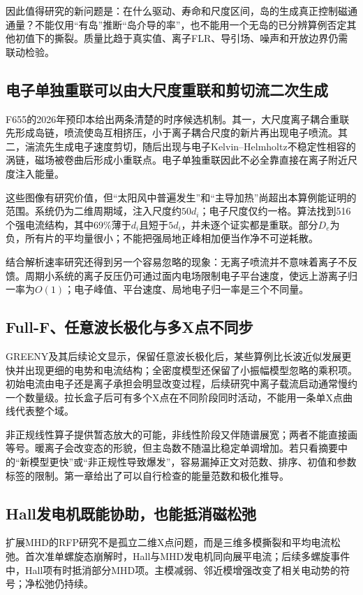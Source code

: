 因此值得研究的新问题是：在什么驱动、寿命和尺度区间，岛的生成真正控制磁通通量？不能仅用“有岛”推断“岛介导的率”，也不能用一个无岛的已分辨算例否定其他初值下的撕裂。质量比趋于真实值、离子FLR、导引场、噪声和开放边界仍需联动检验。

\subsection{电子单独重联可以由大尺度重联和剪切流二次生成}
F655的2026年预印本\citep{F655}给出两条清楚的时序候选机制。其一，大尺度离子耦合重联先形成岛链，喷流使岛互相挤压，小于离子耦合尺度的新片再出现电子喷流。其二，湍流先生成电子速度剪切，随后出现与电子Kelvin--Helmholtz不稳定性相容的涡链，磁场被卷曲后形成小重联点。电子单独重联因此不必全靠直接在离子附近尺度注入能量。

这些图像有研究价值，但“太阳风中普遍发生”和“主导加热”尚超出本算例能证明的范围。系统仍为二维周期域，注入尺度约$50d_i$；电子尺度仅约一格。算法找到516个强电流结构，其中69\%薄于$d_i$且短于$5d_i$，并未逐个证实都是重联。部分$D_e$为负，所有片的平均量很小；不能把强局地正峰相加便当作净不可逆耗散。

结合解析速率研究\citep{F741}还得到另一个容易忽略的现象：无离子喷流并不意味着离子不反馈。周期小系统的离子反压仍可通过面内电场限制电子平台速度，使远上游离子归一率为$O(1)$；电子峰值、平台速度、局地电子归一率是三个不同量。

\subsection{Full-F、任意波长极化与多X点不同步}
GREENY及其后续论文\citep{E473,L314}显示，保留任意波长极化后，某些算例比长波近似发展更快并出现更细的电势和电流结构；全密度模型还保留了小振幅模型忽略的乘积项。初始电流由电子还是离子承担会明显改变过程，后续研究中离子载流启动通常慢约一个数量级。拉长盒子后可有多个X点在不同阶段同时活动，不能用一条单X点曲线代表整个域。

非正规线性算子提供暂态放大的可能，非线性阶段又伴随谱展宽；两者不能直接画等号。暖离子会改变态的形貌，但主岛数不随温比稳定单调增加。若只看摘要中的“新模型更快”或“非正规性导致爆发”，容易漏掉正文对范数、排序、初值和参数标签的限制。第一章给出了可以自行检查的能量范数和极化推导。

\subsection{Hall发电机既能协助，也能抵消磁松弛}
扩展MHD的RFP研究\citep{F798}不是孤立二维X点问题，而是三维多模撕裂和平均电流松弛。首次准单螺旋态崩解时，Hall与MHD发电机同向展平电流；后续多螺旋事件中，Hall项有时抵消部分MHD项。主模减弱、邻近模增强改变了相关电动势的符号；净松弛仍持续。

